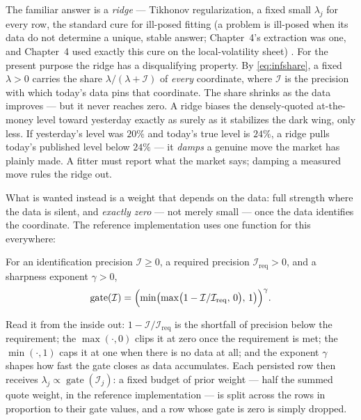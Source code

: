 The familiar answer is a \emph{ridge} --- Tikhonov regularization, a
fixed small $\lambda_j$ for every row, the standard cure for
ill-posed fitting (a problem is ill-posed when its data do not
determine a unique, stable answer; Chapter~4's extraction was one,
and Chapter~4 used exactly this cure on the local-volatility sheet)
\citep{Tikhonov1977}.  For the present purpose the ridge has a
disqualifying property.  By \cref{eq:infshare}, a fixed
$\lambda>0$ carries the share $\lambda/(\lambda+\mathcal{I})$ of
\emph{every} coordinate, where $\mathcal{I}$ is the precision with
which today's data pins that coordinate.  The share shrinks as the
data improves --- but it never reaches zero.  A ridge biases the
densely-quoted at-the-money level toward yesterday exactly as
surely as it stabilizes the dark wing, only less.  If yesterday's
level was $20\%$ and today's true level is $24\%$, a ridge pulls
today's published level below $24\%$ --- it \emph{damps} a genuine
move the market has plainly made.  A fitter must report what the
market says; damping a measured move rules the ridge out.

What is wanted instead is a weight that depends on the data: full
strength where the data is silent, and \emph{exactly zero} --- not
merely small --- once the data identifies the coordinate.  The
reference implementation uses one function for this everywhere:

\begin{definition}
\label{def:infgate}
For an identification precision $\mathcal{I}\ge0$, a required
precision $\mathcal{I}_{\mathrm{req}}>0$, and a sharpness exponent
$\gamma>0$,
\begin{equation}
\operatorname{gate}(\mathcal{I})
=\Bigl(\min\bigl(\max\bigl(1-\mathcal{I}/\mathcal{I}_{\mathrm{req}},
\,0\bigr),\,1\bigr)\Bigr)^{\gamma}.
\label{eq:infgate}
\end{equation}
\end{definition}

Read it from the inside out: $1-\mathcal{I}/\mathcal{I}_{\mathrm{req}}$
is the shortfall of precision below the requirement; the
$\max(\cdot,0)$ clips it at zero once the requirement is met; the
$\min(\cdot,1)$ caps it at one when there is no data at all; and the
exponent $\gamma$ shapes how fast the gate closes as data
accumulates.  Each persisted row then receives
$\lambda_j\propto\operatorname{gate}(\mathcal{I}_j)$: a fixed
budget of prior weight --- half the summed quote weight, in the
reference implementation --- is split across the rows in proportion to
their gate values, and a row whose gate is zero is simply dropped.

